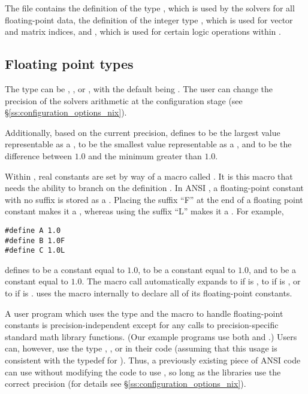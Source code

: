 %
The  file contains the definition of the type ,
which is used by the {\sundials} solvers for all floating-point data, the definition 
of the integer type , which is used for vector and matrix indices,
and , which is used for certain logic operations within {\sundials}.


\subsection{Floating point types}

The type  can be , , or , with
the default being .
The user can change the precision of the {\sundials} solvers arithmetic at the
configuration stage (see \S\ref{ss:configuration_options_nix}).

Additionally, based on the current precision,  defines 
 to be the largest value representable as a ,
 to be the smallest value representable as a , and
 to be the difference between $1.0$ and the minimum 
greater than $1.0$.

Within {\sundials}, real constants are set by way of a macro called
.  It is this macro that needs the ability to branch on the
definition .  In ANSI {\CC}, a floating-point constant with no
suffix is stored as a .  Placing the suffix ``F'' at the
end of a floating point constant makes it a , whereas using the suffix
``L'' makes it a .  For example,
\begin{verbatim}
#define A 1.0
#define B 1.0F
#define C 1.0L
\end{verbatim}
defines  to be a  constant equal to $1.0$,  to be a
 constant equal to $1.0$, and  to be a  constant
equal to $1.0$.  The macro call  automatically expands to 
if  is , to  if  is ,
or to  if  is .  {\sundials} uses the
 macro internally to declare all of its floating-point constants. 

A user program which uses the type  and the  macro
to handle floating-point constants is precision-independent except for
any calls to precision-specific standard math library
functions.  (Our example programs use both  and
.)  Users can, however, use the type , , or
 in their code (assuming that this usage is consistent
with the typedef for ).  Thus, a previously existing
piece of ANSI {\CC} code can use {\sundials} without modifying the code
to use , so long as the {\sundials} libraries use the
correct precision (for details see \S\ref{ss:configuration_options_nix}).


